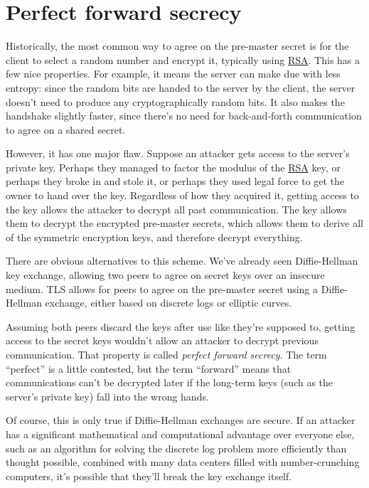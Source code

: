 \documentclass[11pt,ebook,table,dvipsnames]{memoir}
\begin{document}
\section{Perfect forward secrecy}
\label{sec-3-1-6}

Historically, the most common way to agree on the pre-master secret is
for the client to select a random number and encrypt it, typically
using \hyperref[RSA]{RSA}. This has a few nice properties. For example, it means the
server can make due with less entropy: since the random bits are
handed to the server by the client, the server doesn't need to produce
any cryptographically random bits. It also makes the handshake
slightly faster, since there's no need for back-and-forth
communication to agree on a shared secret.

However, it has one major flaw. Suppose an attacker gets access to the
server's private key. Perhaps they managed to factor the modulus of
the \hyperref[RSA]{RSA} key, or perhaps they broke in and stole it, or perhaps they
used legal force to get the owner to hand over the key. Regardless of
how they acquired it, getting access to the key allows the attacker to
decrypt all past communication. The key allows them to decrypt the
encrypted pre-master secrets, which allows them to derive all of the
symmetric encryption keys, and therefore decrypt everything.

There are obvious alternatives to this scheme. We've already seen
Diffie-Hellman key exchange, allowing two peers to agree on secret
keys over an insecure medium. TLS allows for peers to agree on the
pre-master secret using a Diffie-Hellman exchange, either based on
discrete logs or elliptic curves.

Assuming both peers discard the keys after use like they're supposed
to, getting access to the secret keys wouldn't allow an attacker to
decrypt previous communication. That property is called \emph{perfect
forward secrecy}. The term \enquote{perfect} is a little contested, but the
term \enquote{forward} means that communications can't be decrypted later if
the long-term keys (such as the server's private key) fall into the
wrong hands.

Of course, this is only true if Diffie-Hellman exchanges are secure.
If an attacker has a significant mathematical and computational
advantage over everyone else, such as an algorithm for solving the
discrete log problem more efficiently than thought possible, combined
with many data centers filled with number-crunching computers, it's
possible that they'll break the key exchange itself.
\end{document}

